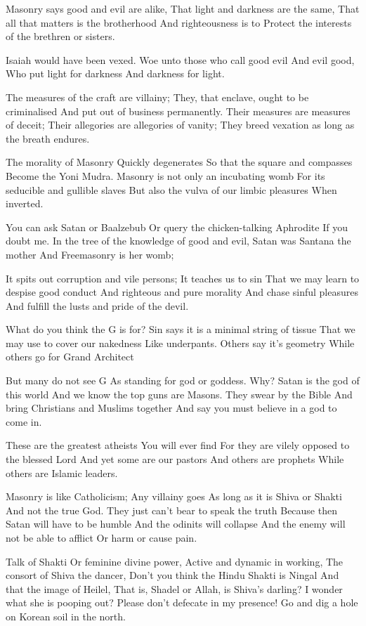 \documentclass[
]{book}
\begin{document}
Masonry says good and evil are alike,
That light and darkness are the same,
That all that matters is the brotherhood
And righteousness is to
Protect the interests of the brethren or sisters.

Isaiah would have been vexed.
Woe unto those who call good evil
And evil good,
Who put light for darkness
And darkness for light.

The measures of the craft are villainy;
They, that enclave, ought to be criminalised
And put out of business permanently.
Their measures are measures of deceit;
Their allegories are allegories of vanity;
They breed vexation as long as the breath endures.

The morality of Masonry
Quickly degenerates
So that the square and compasses
Become the Yoni Mudra.
Masonry is not only an incubating womb
For its seducible and gullible slaves
But also the vulva of our limbic pleasures
When inverted.

You can ask Satan or Baalzebub
Or query the chicken-talking Aphrodite
If you doubt me.
In the tree of the knowledge of good and evil,
Satan was Santana the mother
And Freemasonry is her womb;

It spits out corruption and vile persons;
It teaches us to sin
That we may learn to despise good conduct
And righteous and pure morality
And chase sinful pleasures
And fulfill the lusts and pride of the devil.

What do you think the G is for?
Sin says it is a minimal string of tissue
That we may use to cover our nakedness
Like underpants.
Others say it's geometry
While others go for Grand Architect

But many do not see G
As standing for god or goddess.
Why? Satan is the god of this world
And we know the top guns are Masons.
They swear by the Bible
And bring Christians and Muslims together
And say you must believe in a god to come in.

These are the greatest atheists
You will ever find
For they are vilely opposed to the blessed Lord
And yet some are our pastors
And others are prophets
While others are Islamic leaders.

Masonry is like Catholicism;
Any villainy goes
As long as it is Shiva or Shakti
And not the true God.
They just can't bear to speak the truth
Because then Satan will have to be humble
And the odinits will collapse
And the enemy will not be able to afflict
Or harm or cause pain.

Talk of Shakti
Or feminine divine power,
Active and dynamic in working,
The consort of Shiva the dancer,
Don't you think the Hindu Shakti is Ningal
And that the image of Heilel,
That is, Shadel or Allah, is Shiva's darling?
I wonder what she is pooping out?
Please don't defecate in my presence!
Go and dig a hole on Korean soil in the north.
\end{document}
